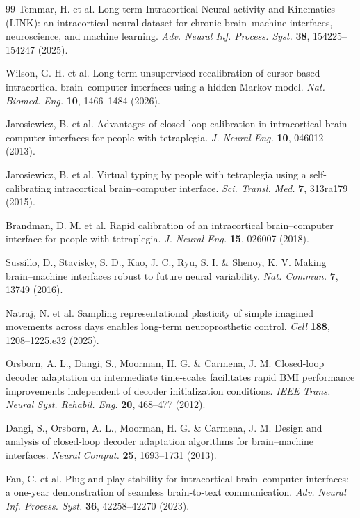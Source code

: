 \begin{thebibliography}{99}
 Temmar, H. et al. Long-term Intracortical Neural activity and Kinematics (LINK): an intracortical neural dataset for chronic brain--machine interfaces, neuroscience, and machine learning. \textit{Adv. Neural Inf. Process. Syst.} \textbf{38}, 154225--154247 (2025).

 Wilson, G. H. et al. Long-term unsupervised recalibration of cursor-based intracortical brain--computer interfaces using a hidden Markov model. \textit{Nat. Biomed. Eng.} \textbf{10}, 1466--1484 (2026).

 Jarosiewicz, B. et al. Advantages of closed-loop calibration in intracortical brain--computer interfaces for people with tetraplegia. \textit{J. Neural Eng.} \textbf{10}, 046012 (2013).

 Jarosiewicz, B. et al. Virtual typing by people with tetraplegia using a self-calibrating intracortical brain--computer interface. \textit{Sci. Transl. Med.} \textbf{7}, 313ra179 (2015).

 Brandman, D. M. et al. Rapid calibration of an intracortical brain--computer interface for people with tetraplegia. \textit{J. Neural Eng.} \textbf{15}, 026007 (2018).

 Sussillo, D., Stavisky, S. D., Kao, J. C., Ryu, S. I. \& Shenoy, K. V. Making brain--machine interfaces robust to future neural variability. \textit{Nat. Commun.} \textbf{7}, 13749 (2016).

 Natraj, N. et al. Sampling representational plasticity of simple imagined movements across days enables long-term neuroprosthetic control. \textit{Cell} \textbf{188}, 1208--1225.e32 (2025).

 Orsborn, A. L., Dangi, S., Moorman, H. G. \& Carmena, J. M. Closed-loop decoder adaptation on intermediate time-scales facilitates rapid BMI performance improvements independent of decoder initialization conditions. \textit{IEEE Trans. Neural Syst. Rehabil. Eng.} \textbf{20}, 468--477 (2012).

 Dangi, S., Orsborn, A. L., Moorman, H. G. \& Carmena, J. M. Design and analysis of closed-loop decoder adaptation algorithms for brain--machine interfaces. \textit{Neural Comput.} \textbf{25}, 1693--1731 (2013).

 Fan, C. et al. Plug-and-play stability for intracortical brain--computer interfaces: a one-year demonstration of seamless brain-to-text communication. \textit{Adv. Neural Inf. Process. Syst.} \textbf{36}, 42258--42270 (2023).


\end{thebibliography}

